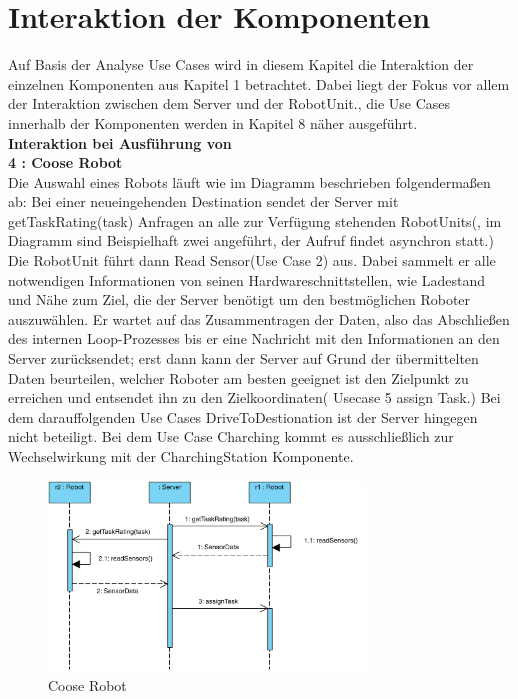 \section{Interaktion der Komponenten}
Auf Basis der Analyse Use Cases wird in diesem Kapitel die Interaktion der einzelnen Komponenten aus Kapitel 1 betrachtet. Dabei liegt der Fokus vor allem der Interaktion zwischen dem Server und der RobotUnit., die Use Cases innerhalb der Komponenten werden in Kapitel 8 näher ausgeführt.\\


\textbf{Interaktion bei Ausführung von\\
4 : Coose Robot}\\
Die Auswahl eines Robots läuft wie im Diagramm beschrieben folgendermaßen ab: Bei einer neueingehenden Destination sendet der Server mit getTaskRating(task) Anfragen an alle zur Verfügung stehenden RobotUnits(, im Diagramm sind Beispielhaft zwei angeführt, der Aufruf findet asynchron statt.) Die RobotUnit führt dann Read Sensor(Use Case 2) aus. Dabei sammelt er alle notwendigen Informationen von seinen Hardwareschnittstellen, wie Ladestand und Nähe zum Ziel, die der Server benötigt um den bestmöglichen Roboter auszuwählen. Er wartet auf das Zusammentragen der Daten, also das Abschließen des internen Loop-Prozesses bis er eine Nachricht mit den Informationen an den Server zurücksendet; erst dann kann der Server auf Grund der übermittelten Daten beurteilen, welcher Roboter am besten geeignet ist den Zielpunkt zu erreichen und entsendet ihn zu den Zielkoordinaten( Usecase 5 assign Task.) Bei dem darauffolgenden Use Cases DriveToDestionation ist der Server hingegen nicht beteiligt. Bei dem Use Case Charching kommt es ausschließlich zur Wechselwirkung mit der CharchingStation Komponente.



\begin{figure}[H]
	\centering
	\includegraphics[width=0.75\textwidth]{img/2-chooseRobot}
	\caption{Coose Robot}
	\label{SequenzDiagrammInteraktion}
\end{figure}
